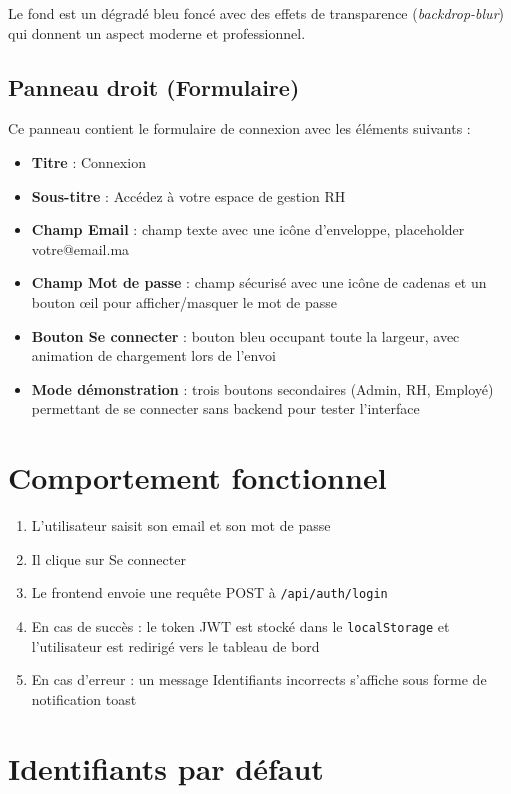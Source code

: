\documentclass[12pt,a4paper]{report}
\begin{document}
Le fond est un dégradé bleu foncé avec des effets de transparence (\textit{backdrop-blur}) qui donnent un aspect moderne et professionnel.

\subsection{Panneau droit (Formulaire)}

Ce panneau contient le formulaire de connexion avec les éléments suivants :
\begin{itemize}
    \item \textbf{Titre} : \og Connexion \fg{}
    \item \textbf{Sous-titre} : \og Accédez à votre espace de gestion RH \fg{}
    \item \textbf{Champ Email} : champ texte avec une icône d'enveloppe, placeholder \og votre@email.ma \fg{}
    \item \textbf{Champ Mot de passe} : champ sécurisé avec une icône de cadenas et un bouton \og œil \fg{} pour afficher/masquer le mot de passe
    \item \textbf{Bouton Se connecter} : bouton bleu occupant toute la largeur, avec animation de chargement lors de l'envoi
    \item \textbf{Mode démonstration} : trois boutons secondaires (Admin, RH, Employé) permettant de se connecter sans backend pour tester l'interface
\end{itemize}

\section{Comportement fonctionnel}

\begin{enumerate}
    \item L'utilisateur saisit son email et son mot de passe
    \item Il clique sur \og Se connecter \fg{}
    \item Le frontend envoie une requête POST à \texttt{/api/auth/login}
    \item En cas de succès : le token JWT est stocké dans le \texttt{localStorage} et l'utilisateur est redirigé vers le tableau de bord
    \item En cas d'erreur : un message \og Identifiants incorrects \fg{} s'affiche sous forme de notification toast
\end{enumerate}

\section{Identifiants par défaut}
\end{document}
